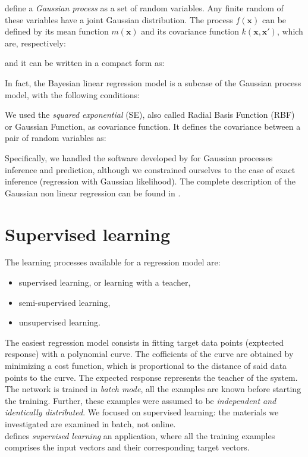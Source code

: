 \citet{RefWorks:192} define a \textit{Gaussian process} as a set of random variables. 
Any finite random of these variables have a joint Gaussian distribution.
The process $f(\mathbf{x})$ can be defined by its mean function $m(\mathbf{x})$
and its covariance function $k(\mathbf{x, x'})$, which are, respectively:


and it can be written in a compact form as:

In fact, the Bayesian linear regression model is a subcase of the Gaussian
process model, with the following conditions:

We used the \textit{squared exponential} (SE), also called Radial Basis Function
(RBF) or Gaussian Function, as covariance function. It defines the covariance
between a pair of random variables as:


Specifically, we handled the software developed by \citet{RefWorks:192} 
for Gaussian processes inference and prediction, although we constrained ourselves to the case of exact inference
(regression with Gaussian likelihood).
The complete description of the Gaussian non linear regression can be found in
\citet{RefWorks:194}.


\section{Supervised learning}
\label{sec:supervisedlearning}

The learning processes available for a regression model are:

\begin{itemize}
  \item{supervised learning, or learning with a teacher,}
  \item{semi-supervised learning,}
  \item{unsupervised learning.}
\end{itemize}

The easiest regression model consists in fitting target data
points (exptected response) with a polynomial curve.
The cofficients of the curve are obtained by minimizing a cost function, which
is proportional to the distance of said data points to the curve.
The expected response represents the teacher of the system.
The network is trained in \textit{batch mode}, all the examples are known before
starting the training.
Further, these examples were assumed to be \textit{independent and identically
distributed}.
We focused on supervised learning: the materials we investigated
are examined in batch, not online.\\
\citet{RefWorks:194} defines \textit{supervised learning} an application, where all the
training examples comprises the input vectors and their corresponding target
vectors.


